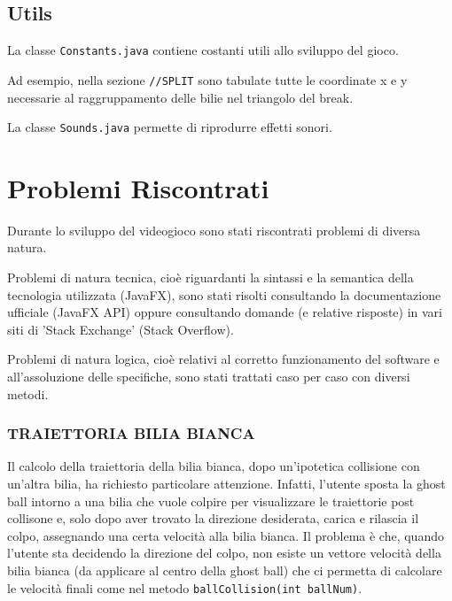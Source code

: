 \documentclass[12pt,a4paper]{report}
\begin{document}
\subsection{Utils} \label{se:Utils} %
La classe \texttt{Constants.java} contiene costanti utili allo sviluppo del gioco.

Ad esempio, nella sezione \texttt{//SPLIT} sono tabulate tutte le coordinate x e y necessarie al raggruppamento delle bilie nel triangolo del break.

\vspace{3mm}

La classe \texttt{Sounds.java} permette di riprodurre effetti sonori.

\section{Problemi Riscontrati} \label{se:Issues} %
Durante lo sviluppo del videogioco sono stati riscontrati problemi di diversa natura.

\vspace{3mm}

Problemi di natura tecnica, cioè riguardanti la sintassi e la semantica della tecnologia utilizzata (JavaFX), sono stati risolti consultando la documentazione ufficiale (JavaFX API) oppure consultando domande (e relative risposte) in vari siti di 'Stack Exchange' (Stack Overflow).

\vspace{3mm}

Problemi di natura logica, cioè relativi al corretto funzionamento del software e all'assoluzione delle specifiche, sono stati trattati caso per caso con diversi metodi.

\subsubsection*{TRAIETTORIA BILIA BIANCA}
Il calcolo della traiettoria della bilia bianca, dopo un'ipotetica collisione con un'altra bilia, ha richiesto particolare attenzione.
Infatti, l'utente sposta la ghost ball intorno a una bilia che vuole colpire per visualizzare le traiettorie post collisone e, solo dopo aver trovato la direzione desiderata, carica e rilascia il colpo, assegnando una certa velocità alla bilia bianca.
Il problema è che, quando l'utente sta decidendo la direzione del colpo, non esiste un vettore velocità della bilia bianca (da applicare al centro della ghost ball) che ci permetta di calcolare le velocità finali come nel metodo \texttt{ballCollision(int ballNum)}.
\end{document}
